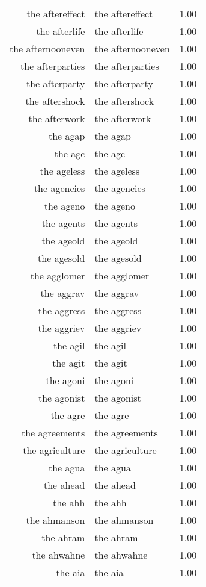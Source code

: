 \begin{table}[ht]
\begin{tabular}{rlr}
  the aftereffect & the aftereffect & 1.00 \\ 
  the afterlife & the afterlife & 1.00 \\ 
  the afternooneven & the afternooneven & 1.00 \\ 
  the afterparties & the afterparties & 1.00 \\ 
  the afterparty & the afterparty & 1.00 \\ 
  the aftershock & the aftershock & 1.00 \\ 
  the afterwork & the afterwork & 1.00 \\ 
  the agap & the agap & 1.00 \\ 
  the agc & the agc & 1.00 \\ 
  the ageless & the ageless & 1.00 \\ 
  the agencies & the agencies & 1.00 \\ 
  the ageno & the ageno & 1.00 \\ 
  the agents & the agents & 1.00 \\ 
  the ageold & the ageold & 1.00 \\ 
  the agesold & the agesold & 1.00 \\ 
  the agglomer & the agglomer & 1.00 \\ 
  the aggrav & the aggrav & 1.00 \\ 
  the aggress & the aggress & 1.00 \\ 
  the aggriev & the aggriev & 1.00 \\ 
  the agil & the agil & 1.00 \\ 
  the agit & the agit & 1.00 \\ 
  the agoni & the agoni & 1.00 \\ 
  the agonist & the agonist & 1.00 \\ 
  the agre & the agre & 1.00 \\ 
  the agreements & the agreements & 1.00 \\ 
  the agriculture & the agriculture & 1.00 \\ 
  the agua & the agua & 1.00 \\ 
  the ahead & the ahead & 1.00 \\ 
  the ahh & the ahh & 1.00 \\ 
  the ahmanson & the ahmanson & 1.00 \\ 
  the ahram & the ahram & 1.00 \\ 
  the ahwahne & the ahwahne & 1.00 \\ 
  the aia & the aia & 1.00 \\ 

\end{tabular}
\end{table}
